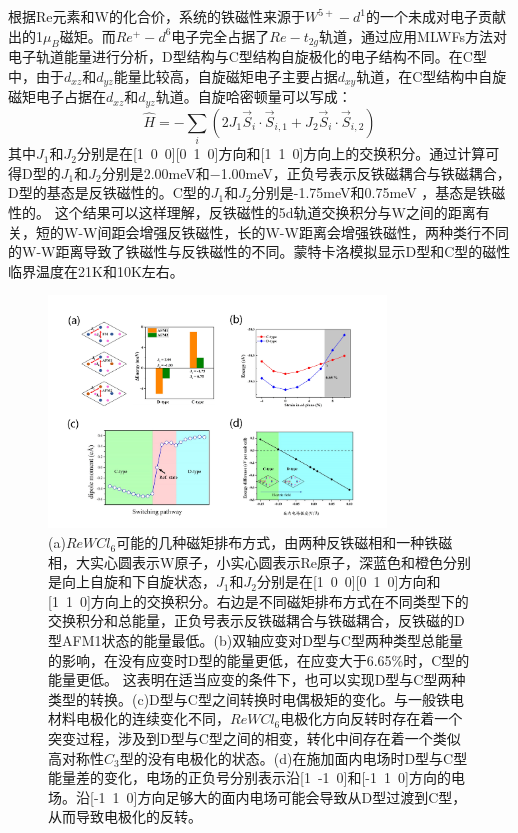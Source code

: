 根据Re元素和W的化合价，系统的铁磁性来源于$W^{5+}-d^{1}$的一个未成对电子贡献出的1$\mu_{B}$磁矩。而$Re^{+}-d^{6}$电子完全占据了$Re-t_{2g}$轨道，通过应用MLWFs方法对电子轨道能量进行分析，D型结构与C型结构自旋极化的电子结构不同。在C型中，由于$d_{xz}\text{和}d_{yz}$能量比较高，自旋磁矩电子主要占据$d_{xy}$轨道，在C型结构中自旋磁矩电子占据在$d_{xz}\text{和}d_{yz}$轨道。自旋哈密顿量可以写成：
\begin{equation}
    \hat{H}=-\sum_{i}(2J_{1}\vec{S}_{i}\cdot \vec{S}_{i,1}+ J_{2}\vec{S}_{i}\cdot \vec{S}_{i,2})
    \label{zixuan}
\end{equation}
其中$J_{1}\text{和}J_{2}$分别是在[1\ 0\ 0][0\ 1\ 0]方向和[1\ 1\ 0]方向上的交换积分。通过计算可得D型的$J_{1}\text{和}J_{2}$分别是2.00meV和−1.00meV，正负号表示反铁磁耦合与铁磁耦合，D型的基态是反铁磁性的。C型的$J_{1}\text{和}J_{2}$分别是-1.75meV和0.75meV ，基态是铁磁性的。\cite{PhysRevB.82.094116} 这个结果可以这样理解，反铁磁性的5d轨道交换积分与W之间的距离有关，短的W-W间距会增强反铁磁性，长的W-W距离会增强铁磁性，两种类行不同的W-W距离导致了铁磁性与反铁磁性的不同。蒙特卡洛模拟显示D型和C型的磁性临界温度在21K和10K左右。\cite{katsura2005spin}

\begin{figure}[h]
    \centering
\includegraphics[width=0.8\textwidth]{./pic/023.png}
\caption{(a)$ReWCl_{6}$可能的几种磁矩排布方式，由两种反铁磁相和一种铁磁相，大实心圆表示W原子，小实心圆表示Re原子，深蓝色和橙色分别是向上自旋和下自旋状态，$J_{1}\text{和}J_{2}$分别是在[1\ 0\ 0][0\ 1\ 0]方向和[1\ 1\ 0]方向上的交换积分。右边是不同磁矩排布方式在不同类型下的交换积分和总能量，正负号表示反铁磁耦合与铁磁耦合，反铁磁的D型AFM1状态的能量最低。(b)双轴应变对D型与C型两种类型总能量的影响，在没有应变时D型的能量更低，在应变大于6.65\%时，C型的能量更低。\cite{ISI:000480497100035} 这表明在适当应变的条件下，也可以实现D型与C型两种类型的转换。(c)D型与C型之间转换时电偶极矩的变化。与一般铁电材料电极化的连续变化不同，$ReWCl_{6}$电极化方向反转时存在着一个突变过程，涉及到D型与C型之间的相变，转化中间存在着一个类似高对称性$C_{3}$型的没有电极化的状态。(d)在施加面内电场时D型与C型能量差的变化，电场的正负号分别表示沿[1\ -1\ 0]和[-1\ 1\ 0]方向的电场。沿[-1\ 1\ 0]方向足够大的面内电场可能会导致从D型过渡到C型，从而导致电极化的反转。}

\label{dog023}
\end{figure}

